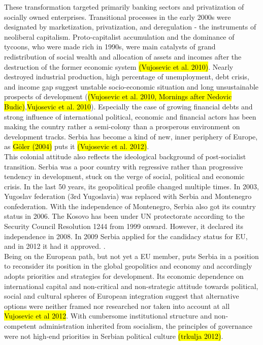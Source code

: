 \documentclass[11pt]{report}
\begin{document}
These transformation targeted primarily banking sectors and privatization of socially owned enterprises. Transitional processes in the early 2000s were designated by marketization, privatization, and deregulation - the instruments of neoliberal capitalism.
Proto-capitalist accumulation and the dominance of tycoons, who were made rich in 1990s, were main catalysts of grand redistribution of social wealth and allocation of assets and incomes after the destruction of the former economic system \hl{(Vujosevic et al. 2010)}.
Nearly destroyed industrial production, high percentage of unemployment, debt crisis, and income gap suggest unstable socio-economic situation and long unsustainable prospects of development (\hl{(Vujosevic et al. 2010, Mornings after Nedovic Budic)},\hl{Vujosevic et al. 2010}).
Especially the case of growing financial debts and strong influence of international political, economic and financial actors has been making the country rather a semi-colony than a prosperous environment on development tracks. Serbia has become a kind of new, inner periphery of Europe, as \hl{Göler (2004)} puts it \hl{(Vujosevic et al. 2012)}.
\\     
This colonial attitude also reflects the ideological background of post-socialist transition.
Serbia was a poor country with regressive rather than progressive tendency in development, stuck on the verge of social, political and economic crisis.
In the last 50 years, its geopolitical profile changed multiple times.
 In 2003, Yugoslav federation (3rd Yugoslavia) was replaced with Serbia and Montenegro confederation.
With the independence of Montenegro, Serbia also got its country status in 2006.
The Kosovo has been under UN protectorate according to the Security Council Resolution 1244 from 1999 onward. However, it declared its independence in 2008.
In 2009 Serbia applied for the candidacy status for EU, and in 2012 it had it approved. .
\\
Being on the European path, but not yet a EU member, puts Serbia in a position to reconsider its position in the global geopolitics and economy and accordingly adopts priorities and strategies for development.
Its economic dependence on international capital and non-critical and non-strategic attitude towards political, social and cultural spheres of European integration suggest that alternative options were neither framed nor researched nor taken into account at all \hl{Vujosevic et al 2012}.
With cumbersome institutional structure and non-competent administration inherited from socialism, the principles of governance were not high-end priorities in Serbian political culture \hl{(trkulja 2012)}.
\end{document}
